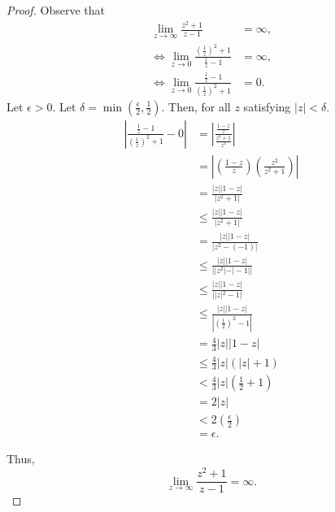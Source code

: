 \documentclass[11pt]{article}		%
\theoremstyle{definition}
\begin{document}
\newpage
{}
\begin{proof}
    Observe that
    \begin{align*}
        \lim_{z\to\infty} \frac{z^2+1}{z-1} &= \infty, \\
        \iff \lim_{z\to0} \frac{\left(\frac1z\right)^2+1}{\frac1z-1} &= \infty, \\
        \iff \lim_{z\to0} \frac{\frac1z-1}{\left(\frac1z\right)^2+1} &= 0.
    \end{align*}
    Let $\epsilon > 0$.
    Let $\delta = \min\left(\frac\epsilon2, \frac12\right)$.
    Then, for all $z$ satisfying $|z| < \delta$.
    \begin{align*}
        \left|\frac{\frac1z-1}{\left(\frac1z\right)^2+1}-0\right| &= \left|\frac{\frac{1-z}z}{\frac{z^2+1}{z^2}}\right| \\
        &= \left|\left(\frac{1-z}z\right)\left(\frac{z^2}{z^2+1}\right)\right| \\
        &= \frac{|z||1-z|}{|z^2+1|} \\
        &\leq \frac{|z||1-z|}{|z^2+1|} \\
        &= \frac{|z||1-z|}{|z^2 - (-1)|} \\
        &\leq \frac{|z||1-z|}{||z^2| - |-1||} \\
        &\leq \frac{|z||1-z|}{||z|^2 - 1|} \\
        &\leq \frac{|z||1-z|}{\left|\left(\frac12\right)^2 - 1\right|} \\
        &= \frac43|z||1-z| \\
        &\leq \frac43|z|(|z| + 1) \\
        &< \frac43|z|\left(\frac12 + 1\right) \\
        &= 2|z| \\
        &< 2\left(\frac\epsilon2\right) \\
        &= \epsilon.
    \end{align*}

    Thus, $$\lim_{z\to\infty} \frac{z^2+1}{z-1} = \infty.$$
\end{proof}
\end{document}
